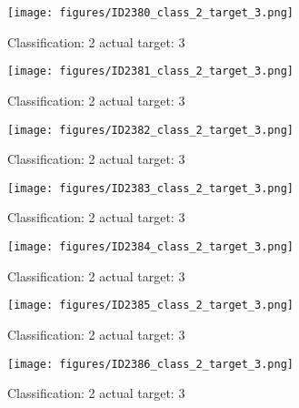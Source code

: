 \begin{figure}[h!]
\begin{center}
\texttt{[image: figures/ID2380\_class\_2\_target\_3.png]}
\end{center}
\caption{ Classification: 2 actual target: 3}
\label{fig:ID2380_class_2_target_3}
\end{figure}
\begin{figure}[h!]
\begin{center}
\texttt{[image: figures/ID2381\_class\_2\_target\_3.png]}
\end{center}
\caption{ Classification: 2 actual target: 3}
\label{fig:ID2381_class_2_target_3}
\end{figure}
\begin{figure}[h!]
\begin{center}
\texttt{[image: figures/ID2382\_class\_2\_target\_3.png]}
\end{center}
\caption{ Classification: 2 actual target: 3}
\label{fig:ID2382_class_2_target_3}
\end{figure}
\begin{figure}[h!]
\begin{center}
\texttt{[image: figures/ID2383\_class\_2\_target\_3.png]}
\end{center}
\caption{ Classification: 2 actual target: 3}
\label{fig:ID2383_class_2_target_3}
\end{figure}
\begin{figure}[h!]
\begin{center}
\texttt{[image: figures/ID2384\_class\_2\_target\_3.png]}
\end{center}
\caption{ Classification: 2 actual target: 3}
\label{fig:ID2384_class_2_target_3}
\end{figure}
\begin{figure}[h!]
\begin{center}
\texttt{[image: figures/ID2385\_class\_2\_target\_3.png]}
\end{center}
\caption{ Classification: 2 actual target: 3}
\label{fig:ID2385_class_2_target_3}
\end{figure}
\begin{figure}[h!]
\begin{center}
\texttt{[image: figures/ID2386\_class\_2\_target\_3.png]}
\end{center}
\caption{ Classification: 2 actual target: 3}
\label{fig:ID2386_class_2_target_3}
\end{figure}
